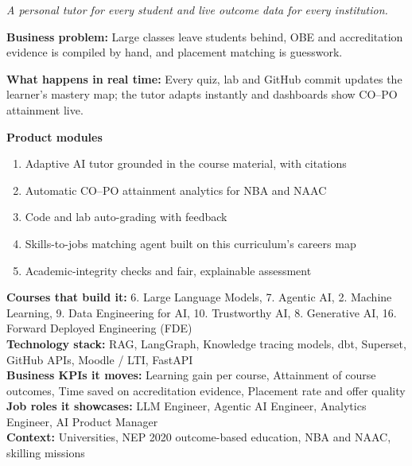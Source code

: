 \documentclass[10pt,a4paper]{article}
\begin{document}
\begin{tcolorbox}[enhanced,breakable,colback=white,colframe=navy,boxrule=0.6pt,arc=2pt,title={\color{goldl}PRODUCT 10 \;|\; EDUCATION \& SKILLING\\\color{white}\large AI Learning, Outcome \& Placement Platform},colbacktitle=navy,fonttitle=\small\bfseries]
{\small\itshape\color{muted}A personal tutor for every student and live outcome data for every institution.}\par
\begin{tcolorbox}[colback=l1bg,colframe=l1bg,arc=2pt,borderline west={3pt}{0pt}{saffron},top=2pt,bottom=2pt]\small\textbf{Business problem:} Large classes leave students behind, OBE and accreditation evidence is compiled by hand, and placement matching is guesswork.\end{tcolorbox}
\begin{tcolorbox}[colback=l3bg,colframe=l3bg,arc=2pt,borderline west={3pt}{0pt}{igreen},top=2pt,bottom=2pt]\small\textbf{What happens in real time:} Every quiz, lab and GitHub commit updates the learner's mastery map; the tutor adapts instantly and dashboards show CO–PO attainment live.\end{tcolorbox}
{\small\textbf{Product modules}}\begin{enumerate}\small
\item Adaptive AI tutor grounded in the course material, with citations
\item Automatic CO–PO attainment analytics for NBA and NAAC
\item Code and lab auto-grading with feedback
\item Skills-to-jobs matching agent built on this curriculum's careers map
\item Academic-integrity checks and fair, explainable assessment
\end{enumerate}
{\small\textbf{Courses that build it:} 6. Large Language Models, 7. Agentic AI, 2. Machine Learning, 9. Data Engineering for AI, 10. Trustworthy AI, 8. Generative AI, 16. Forward Deployed Engineering (FDE)\\\textbf{Technology stack:} RAG, LangGraph, Knowledge tracing models, dbt, Superset, GitHub APIs, Moodle / LTI, FastAPI\\\textbf{Business KPIs it moves:} Learning gain per course, Attainment of course outcomes, Time saved on accreditation evidence, Placement rate and offer quality\\\textbf{Job roles it showcases:} LLM Engineer, Agentic AI Engineer, Analytics Engineer, AI Product Manager\\\textbf{Context:} Universities, NEP 2020 outcome-based education, NBA and NAAC, skilling missions}
\end{tcolorbox}
\end{document}
